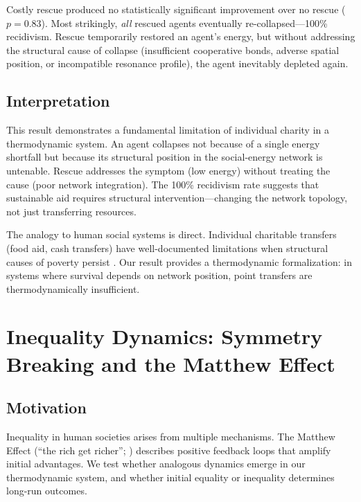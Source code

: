 \documentclass[12pt,a4paper]{article}
\begin{document}
Costly rescue produced no statistically significant improvement over no rescue ($p = 0.83$). Most strikingly, \emph{all} rescued agents eventually re-collapsed---100\% recidivism. Rescue temporarily restored an agent's energy, but without addressing the structural cause of collapse (insufficient cooperative bonds, adverse spatial position, or incompatible resonance profile), the agent inevitably depleted again.

\subsection{Interpretation}

This result demonstrates a fundamental limitation of individual charity in a thermodynamic system. An agent collapses not because of a single energy shortfall but because its structural position in the social-energy network is untenable. Rescue addresses the symptom (low energy) without treating the cause (poor network integration). The 100\% recidivism rate suggests that sustainable aid requires structural intervention---changing the network topology, not just transferring resources.

The analogy to human social systems is direct. Individual charitable transfers (food aid, cash transfers) have well-documented limitations when structural causes of poverty persist \citep{banerjee2011}. Our result provides a thermodynamic formalization: in systems where survival depends on network position, point transfers are thermodynamically insufficient.

\section{Inequality Dynamics: Symmetry Breaking and the Matthew Effect}
\label{sec:inequality}

\subsection{Motivation}

Inequality in human societies arises from multiple mechanisms. The Matthew Effect (``the rich get richer''; \citealt{merton1968}) describes positive feedback loops that amplify initial advantages. We test whether analogous dynamics emerge in our thermodynamic system, and whether initial equality or inequality determines long-run outcomes.
\end{document}

